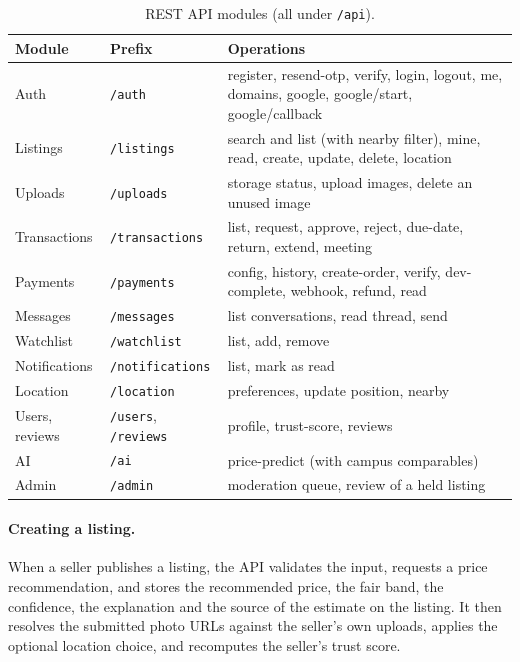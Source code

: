 \documentclass[12pt,letterpaper,twoside,openany]{report}
\newcommand{\code}[1]{\texttt{#1}}
\begin{document}
\begin{table}[htbp]
\centering
\caption{REST API modules (all under \code{/api}).}\label{tab:api}
\small
\begin{tabularx}{\textwidth}{@{}L{2.2cm}L{2.7cm}X@{}}
\toprule
\textbf{Module} & \textbf{Prefix} & \textbf{Operations}\\
\midrule
Auth & \code{/auth} & register, resend-otp, verify, login, logout, me, domains, google, google/start, google/callback\\
Listings & \code{/listings} & search and list (with nearby filter), mine, read, create, update, delete, location\\
Uploads & \code{/uploads} & storage status, upload images, delete an unused image\\
Transactions & \code{/transactions} & list, request, approve, reject, due-date, return, extend, meeting\\
Payments & \code{/payments} & config, history, create-order, verify, dev-complete, webhook, refund, read\\
Messages & \code{/messages} & list conversations, read thread, send\\
Watchlist & \code{/watchlist} & list, add, remove\\
Notifications & \code{/notifications} & list, mark as read\\
Location & \code{/location} & preferences, update position, nearby\\
Users, reviews & \code{/users}, \code{/reviews} & profile, trust-score, reviews\\
AI & \code{/ai} & price-predict (with campus comparables)\\
Admin & \code{/admin} & moderation queue, review of a held listing\\
\bottomrule
\end{tabularx}
\end{table}

\paragraph{Creating a listing.} When a seller publishes a listing, the API validates the input, requests a
price recommendation, and stores the recommended price, the fair band, the confidence, the explanation and
the source of the estimate on the listing. It then resolves the submitted photo URLs against the seller's
own uploads, applies the optional location choice, and recomputes the seller's trust score.
\end{document}
